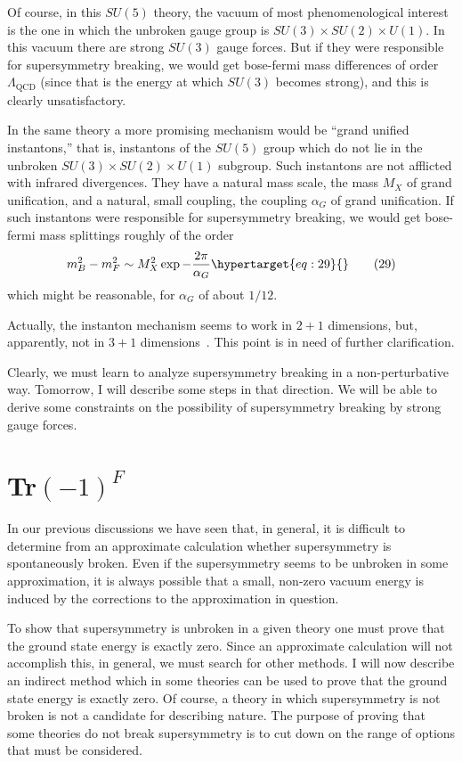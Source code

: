 \documentclass[11pt,a4paper]{article}
\newcommand{\eqtarget}[1]{\hypertarget{eq:#1}{\mathstrut}\tag{#1}}
\begin{document}
Of course, in this $SU(5)$ theory, the vacuum of most phenomenological
interest is the one in which the unbroken gauge group is
$SU(3) \times SU(2) \times U(1)$. In this vacuum there are strong $SU(3)$ gauge
forces. But if they were responsible for supersymmetry breaking, we
would get bose-fermi mass differences of order $\Lambda_{\mathrm{QCD}}$ (since that is
the energy at which $SU(3)$ becomes strong), and this is clearly unsatisfactory.

In the same theory a more promising mechanism would be ``grand
unified instantons,'' that is, instantons of the $SU(5)$ group which
do not lie in the unbroken $SU(3) \times SU(2) \times U(1)$ subgroup. Such
instantons are not afflicted with infrared divergences. They have
a natural mass scale, the mass $M_X$ of grand unification, and a natural,
small coupling, the coupling $\alpha_G$ of grand unification. If such instantons
were responsible for supersymmetry breaking, we would get
bose-fermi mass splittings roughly of the order
\begin{equation}
m_B^2 - m_F^2 \sim M_X^2 \exp - \frac{2\pi}{\alpha_G}
\eqtarget{29}
\end{equation}
which might be reasonable, for $\alpha_G$ of about $1/12$.

Actually, the instanton mechanism seems to work in $2+1$ dimensions,
but, apparently, not in $3+1$ dimensions~\cite{ref6}. This point is in
need of further clarification.

Clearly, we must learn to analyze supersymmetry breaking in a
non-perturbative way. Tomorrow, I will describe some steps in that
direction. We will be able to derive some constraints on the possibility
of supersymmetry breaking by strong gauge forces.

\section[Tr(-1)^F]{Tr$(-1)^F$}

In our previous discussions we have seen that, in general, it
is difficult to determine from an approximate calculation whether
supersymmetry is spontaneously broken. Even if the supersymmetry
seems to be unbroken in some approximation, it is always possible
that a small, non-zero vacuum energy is induced by the corrections
to the approximation in question.

To show that supersymmetry is unbroken in a given theory one
must prove that the ground state energy is exactly zero. Since an
approximate calculation will not accomplish this, in general, we
must search for other methods. I will now describe an indirect
method which in some theories can be used to prove that the ground
state energy is exactly zero. Of course, a theory in which supersymmetry
is not broken is not a candidate for describing nature. The
purpose of proving that some theories do not break supersymmetry is
to cut down on the range of options that must be considered.
\end{document}
